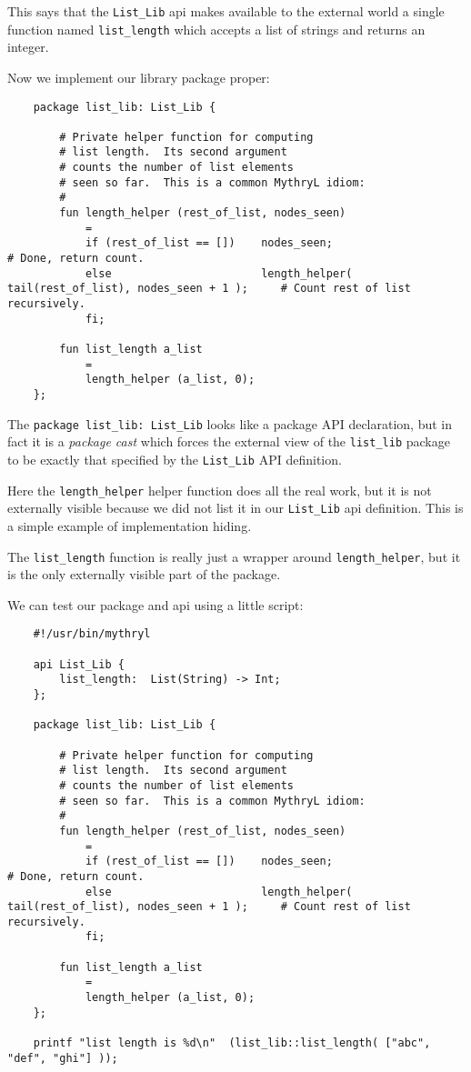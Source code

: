 This says that the {\tt List\_Lib} api makes available to the external 
world a single function named {\tt list\_length} which accepts a 
list of strings and returns an integer.

Now we implement our library package proper:

\begin{verbatim}
    package list_lib: List_Lib {

        # Private helper function for computing
        # list length.  Its second argument
        # counts the number of list elements
        # seen so far.  This is a common MythryL idiom:
        #
        fun length_helper (rest_of_list, nodes_seen)
            =
            if (rest_of_list == [])    nodes_seen;                                              # Done, return count. 
            else                       length_helper( tail(rest_of_list), nodes_seen + 1 );     # Count rest of list recursively.
            fi;

        fun list_length a_list
            =
            length_helper (a_list, 0);
    };
\end{verbatim}

The {\tt package list\_lib: List\_Lib} looks like a package {\sc API} declaration, 
but in fact it is a {\it package cast} which forces the external view of the 
{\tt list\_lib} package to be exactly that specified by the {\tt List\_Lib} {\sc API} definition.

Here the {\tt length\_helper} helper function does all the real work, but 
it is not externally visible because we did not list it in our {\tt List\_Lib} 
api definition.  This is a simple example of implementation hiding.

The {\tt list\_length} function is really just a wrapper around {\tt length\_helper}, 
but it is the only externally visible part of the package.

We can test our package and api using a little script:

\begin{verbatim}
    #!/usr/bin/mythryl

    api List_Lib {
        list_length:  List(String) -> Int;
    };

    package list_lib: List_Lib {

        # Private helper function for computing
        # list length.  Its second argument
        # counts the number of list elements
        # seen so far.  This is a common MythryL idiom:
        #
        fun length_helper (rest_of_list, nodes_seen)
            =
            if (rest_of_list == [])    nodes_seen;                                              # Done, return count. 
            else                       length_helper( tail(rest_of_list), nodes_seen + 1 );     # Count rest of list recursively.
            fi;

        fun list_length a_list
            =
            length_helper (a_list, 0);
    };

    printf "list length is %d\n"  (list_lib::list_length( ["abc", "def", "ghi"] ));
\end{verbatim}

